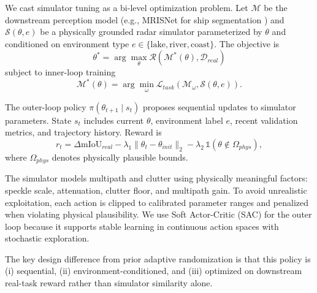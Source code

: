 We cast simulator tuning as a bi-level optimization problem. Let $\mathcal{M}$ be the downstream perception model (e.g., MRISNet for ship segmentation \cite{ma2024mrisnet}) and $\mathcal{S}(\theta, e)$ be a physically grounded radar simulator parameterized by $\theta$ and conditioned on environment type $e \in \{\text{lake}, \text{river}, \text{coast}\}$. The objective is
\begin{equation}
    \theta^* = \arg\max_{\theta} \mathcal{R}\left(\mathcal{M}^*(\theta), \mathcal{D}_{real}\right)
\end{equation}
subject to inner-loop training
\begin{equation}
    \mathcal{M}^*(\theta) = \arg\min_{\omega} \mathcal{L}_{task}\left(\mathcal{M}_{\omega}, \mathcal{S}(\theta, e)\right).
\end{equation}

The outer-loop policy $\pi(\theta_{t+1} \mid s_t)$ proposes sequential updates to simulator parameters. State $s_t$ includes current $\theta$, environment label $e$, recent validation metrics, and trajectory history. Reward is
\begin{equation}
    r_t = \Delta \mathrm{mIoU}_{real} - \lambda_1\|\theta_t-\theta_{init}\|_2 - \lambda_2\,\mathbb{1}(\theta \notin \Omega_{phys}),
\end{equation}
where $\Omega_{phys}$ denotes physically plausible bounds.

The simulator models multipath and clutter using physically meaningful factors: speckle scale, attenuation, clutter floor, and multipath gain. To avoid unrealistic exploitation, each action is clipped to calibrated parameter ranges and penalized when violating physical plausibility. We use Soft Actor-Critic (SAC) for the outer loop because it supports stable learning in continuous action spaces with stochastic exploration.

The key design difference from prior adaptive randomization is that this policy is (i) sequential, (ii) environment-conditioned, and (iii) optimized on downstream real-task reward rather than simulator similarity alone.

